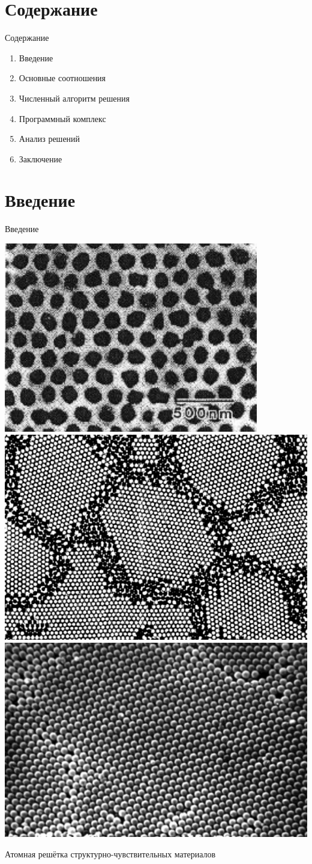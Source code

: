 \begin{frame}
    \setcounter{framenumber}{1}
    \maketitle
\end{frame}

\section{Содержание}

\begin{frame}{Содержание}
	\LARGE
	\begin{enumerate}
		\item Введение
		\item Основные соотношения
		\item Численный алгоритм решения
		\item Программный комплекс
		\item Анализ решений
		\item Заключение
	\end{enumerate}
\end{frame}

\section{Введение}

\begin{frame}{Введение}
\begin{center}
	\includegraphics[width=0.27\linewidth]{pics/Al.png}
	\hfill
	\includegraphics[width=0.3\linewidth]{pics/Atoms.png}
	\hfill
	\includegraphics[width=0.32\linewidth]{pics/Kremnezem.png}
	
	Атомная решётка структурно-чувствительных материалов
\end{center}
\end{frame}

